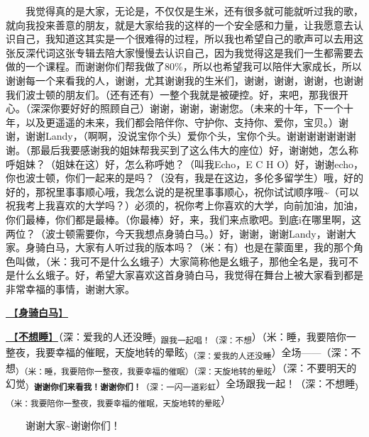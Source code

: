 \documentclass[]{ctexbook}
\begin{document}
  我觉得真的是大家，无论是，不仅仅是生米，还有很多就可能就听过我的歌，就向我投来善意的朋友，就是大家给我的这样的一个安全感和力量，让我愿意去认识自己，我知道这其实是一个很难得的过程，所以我也希望自己的歌声可以去用这张反深代词这张专辑去陪大家慢慢去认识自己，因为我觉得这是我们一生都需要去做的一个课程。而谢谢你们帮我做了80\%，所以也希望我可以陪伴大家成长，所以谢谢每一个来看我的人，谢谢，尤其谢谢我的生米们，谢谢，谢谢，谢谢，也谢谢我们波士顿的朋友们。（还有还有）一整个我就是被硬控。好，来吧，那我很开心。（深深你要好好的照顾自己）谢谢，谢谢，谢谢您。（未来的十年，下一个十年，以及更遥遥的未来，我们都会陪伴你、守护你、支持你、爱你，宝贝。）谢谢，谢谢Landy，（啊啊，没说宝你个头）爱你个头，宝你个头。谢谢谢谢谢谢谢谢。（那最后我要感谢我的姐妹帮我买到了这么伟大的座位）好，谢谢她，怎么称呼姐妹？（姐妹在这）好，怎么称呼她？（叫我Echo，E C H O）好，谢谢echo，你也波士顿，你们一起来的是吗？（没有，我是在这边，多伦多留学生）哦，好的好的，那祝里事事顺心哦，我怎么说的是祝里事事顺心，祝你试试顺序哦\textasciitilde（可以祝我考上我喜欢的大学吗？）必须的，祝你考上你喜欢的大学，向前加油，加油，你们最棒，你们都是最棒。（你最棒）好，来，我们来点歌吧。到底i在哪里啊，这两位？（波士顿需要你，今天我想点身骑白马。）好，谢谢，谢谢Landy，谢谢大家。身骑白马，大家有人听过我的版本吗？（米：有）也是在蒙面里，我的那个角色叫做，（米：我可不是什么幺蛾子）大家简称他是幺蛾子，那他全名是，我可不是什么幺蛾子。好，希望大家喜欢这首身骑白马，我觉得在舞台上被大家看到都是非常幸福的事情，谢谢大家。

\hyperref[Rading-white-horse]{🎵【\textbf{身骑白马}】}

\hyperref[donot-want-to-sleep]{🎵【\textbf{不想睡}】}（深：爱我的人还没睡\textsubscript{）跟我一起唱！（深：不想}）（米：睡，我要陪你一整夜，我要幸福的催眠，天旋地转的晕眩\textsubscript{）（深：爱我的人还没睡}）全场------（深：不想\textsubscript{）（米：睡，我要陪你一整夜，我要幸福的催眠）（深：天旋地转的晕眩}）（深：不要明天的幻觉\textsubscript{）\textbf{谢谢你们来看我！谢谢你们！}（深：一闪一道彩虹}）全场跟我一起！（深：不想睡\textsubscript{）（米：我要陪你一整夜，我要幸福的催眠，天旋地转的晕眩}）

  谢谢大家\textasciitilde 谢谢你们！
\end{document}
